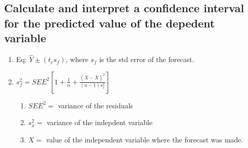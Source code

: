 \documentclass{article}
\begin{document}
\subsection{Calculate and interpret a confidence interval for the predicted 
value of the depedent variable}
\begin{enumerate}
    \item Eq: $\hat{Y}\pm(t_c s_f)$, where $s_f$ is the {\color{red}std error of the forecast.}
    \item $s_f^2=SEE^2 \left[1+\frac{1}{n}+\frac{(X-\bar X)^2}{(n-1)s_x^2} \right]$
        \begin{enumerate}
            \item $SEE^2=$ variance of the residuals
            \item $s_x^2=$ variance of the indepdent variable
            \item $X =$ value of the independent variable where the forecast was
                made.
        \end{enumerate}
\end{enumerate}
\end{document}
